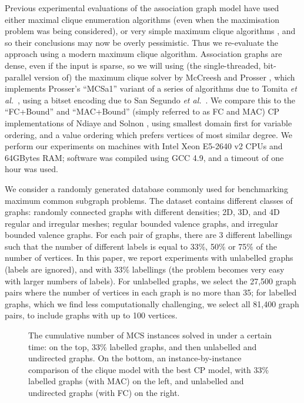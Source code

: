 \documentclass{llncs}
\begin{document}
Previous experimental evaluations of the association graph model have used either maximal clique
enumeration algorithms \cite{DBLP:journals/tcs/Koch01,DBLP:conf/mco/VismaraV08} (even when the
maximisation problem was being considered), or very simple maximum clique algorithms
\cite{DBLP:conf/sspr/BunkeFGSV02,DBLP:journals/jgaa/ConteFV07}, and so their conclusions may now be
overly pessimistic. Thus we re-evaluate the approach using a modern maximum clique algorithm.
Association graphs are dense, even if the input is sparse, so we will using (the single-threaded,
bit-parallel version of) the maximum clique solver by McCreesh and Prosser
\cite{DBLP:journals/topc/McCreeshP15}, which implements Prosser's
\cite{DBLP:journals/algorithms/Prosser12} ``MCSa1'' variant of a series of algorithms due to Tomita
\textit{et al.}\
\cite{DBLP:conf/dmtcs/TomitaS03,DBLP:journals/jgo/TomitaK07,DBLP:conf/walcom/TomitaSHTW10}, using a
bitset encoding due to San Segundo \textit{et al.}\
\cite{DBLP:journals/cor/SegundoRJ11,DBLP:journals/ol/SegundoMRH13}. We compare this to the
``FC+Bound'' and ``MAC+Bound'' (simply referred to as FC and MAC) CP implementations of Ndiaye and
Solnon \cite{DBLP:conf/cp/NdiayeS11}, using smallest domain first for variable ordering, and a value
ordering which prefers vertices of most similar degree.  We perform our experiments on machines with
Intel Xeon E5-2640 v2 CPUs and 64GBytes RAM; software was compiled using GCC 4.9, and a timeout of
one hour was used.

We consider a randomly generated database
\cite{DBLP:journals/prl/SantoFSV03,DBLP:journals/jgaa/ConteFV07} commonly used for benchmarking
maximum common subgraph problems.  The dataset contains different classes of graphs: randomly
connected graphs with different densities; 2D, 3D, and 4D regular and irregular meshes; regular
bounded valence graphs, and irregular bounded valence graphs.  For each pair of graphs, there are 3
different labellings such that the number of different labels is equal to 33\%, 50\% or 75\% of the
number of vertices. In this paper, we report experiments with unlabelled graphs (labels are
ignored), and with 33\% labellings (the problem becomes very easy with larger numbers of labels).
For unlabelled graphs, we select the 27,500 graph pairs where the number of vertices in each graph
is no more than 35; for labelled graphs, which we find less computationally challenging, we select
all 81,400 graph pairs, to include graphs with up to 100 vertices.

\begin{figure}[tb]
    \centering
    
    \vspace*{1em}

    \centering
    
    \caption{The cumulative number of MCS instances solved in under a certain time: on the top, 33\%
        labelled graphs, and then unlabelled and undirected graphs. On the bottom, an
        instance-by-instance comparison of the clique model with the best CP model, with 33\%
        labelled graphs (with MAC) on the left, and unlabelled and undirected graphs (with FC) on
    the right.} \label{figure:unconnected-cumulative}
\end{figure}
\end{document}
